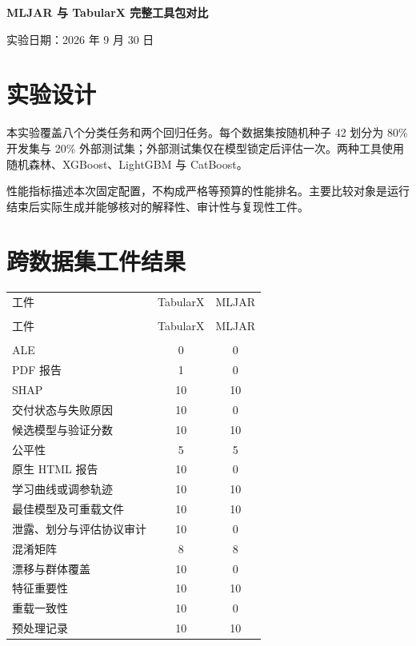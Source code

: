 \documentclass[degree=bachelor,language=chinese,fontset=fandol]{thuthesis}
\begin{document}
\begin{titlepage}\centering\vspace*{2.3cm}
{\bfseries MLJAR 与 TabularX 完整工具包对比\par}
\vfill{实验日期：2026 年 9 月 30 日\par}\vspace{1.2cm}
\end{titlepage}
\frontmatter\tableofcontents\mainmatter
\chapter{实验设计}
本实验覆盖八个分类任务和两个回归任务。每个数据集按随机种子 42 划分为 80\% 开发集与 20\% 外部测试集；外部测试集仅在模型锁定后评估一次。两种工具使用随机森林、XGBoost、LightGBM 与 CatBoost。

性能指标描述本次固定配置，不构成严格等预算的性能排名。主要比较对象是运行结束后实际生成并能够核对的解释性、审计性与复现性工件。

\chapter{跨数据集工件结果}
\begin{longtable}{p{}cc}
\toprule 工件 & TabularX & MLJAR \\\\ \midrule\endfirsthead
\toprule 工件 & TabularX & MLJAR \\\\ \midrule\endhead
ALE & 0 & 0 \\
PDF 报告 & 1 & 0 \\
SHAP & 10 & 10 \\
交付状态与失败原因 & 10 & 0 \\
候选模型与验证分数 & 10 & 10 \\
公平性 & 5 & 5 \\
原生 HTML 报告 & 10 & 0 \\
学习曲线或调参轨迹 & 10 & 10 \\
最佳模型及可重载文件 & 10 & 10 \\
泄露、划分与评估协议审计 & 10 & 0 \\
混淆矩阵 & 8 & 8 \\
漂移与群体覆盖 & 10 & 0 \\
特征重要性 & 10 & 10 \\
重载一致性 & 10 & 0 \\
预处理记录 & 10 & 10 \\
\bottomrule\end{longtable}
\end{document}
